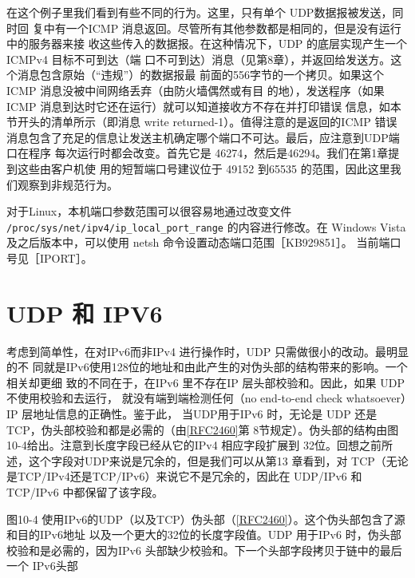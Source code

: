 在这个例子里我们看到有些不同的行为。这里，只有单个 UDP数据报被发送，同时回
复中有一个ICMP 消息返回。尽管所有其他参数都是相同的，但是没有运行中的服务器来接
收这些传入的数据报。在这种情况下，UDP 的底层实现产生一个 ICMPv4 目标不可到达（端
口不可到达）消息（见第8章），并返回给发送方。这个消息包含原始（“违规”）的数据报最
前面的556字节的一个拷贝。如果这个ICMP 消息没被中间网络丢弃（由防火墙偶然或有目
的地），发送程序（如果ICMP 消息到达时它还在运行）就可以知道接收方不存在并打印错误
信息，如本节开头的清单所示（即消息 write returned-1）。值得注意的是返回的ICMP 错误
消息包含了充足的信息让发送主机确定哪个端口不可达。最后，应注意到UDP端口在程序
每次运行时都会改变。首先它是 46274，然后是46294。我们在第1章提到这些由客户机使
用的短暂端口号建议位于 49152 到65535 的范围，因此这里我们观察到非规范行为。

\begin{tcolorbox}
    对于Linux，本机端口参数范围可以很容易地通过改变文件 \verb|/proc/sys/net/ipv4/ip_local_port_range|
    的内容进行修改。在 Windows Vista及之后版本中，可以使用 netsh 命令设置动态端口范围［KB929851］。
    当前端口号见［IPORT］。
\end{tcolorbox}

\section{UDP 和 IPV6}
考虑到简单性，在对IPv6而非IPv4 进行操作时，UDP 只需做很小的改动。最明显的不
同就是IPv6使用128位的地址和由此产生的对伪头部的结构带来的影响。一个相关却更细
致的不同在于，在IPv6 里不存在IP 层头部校验和。因此，如果 UDP 不使用校验和去运行，
就没有端到端检测任何（no end-to-end check whatsoever）IP 层地址信息的正确性。鉴于此，
当UDP用于IPv6 时，无论是 UDP 还是TCP，伪头部校验和都是必需的（由\href{https://www.rfc-editor.org/rfc/rfc2460}{[RFC2460]}第
8节规定）。伪头部的结构由图10-4给出。注意到长度字段已经从它的IPv4 相应字段扩展到
32位。回想之前所述，这个字段对UDP来说是冗余的，但是我们可以从第13 章看到，对
TCP（无论是TCP/IPv4还是TCP/IPv6）来说它不是冗余的，因此在 UDP/IPv6 和 TCP/IPv6
中都保留了该字段。

图10-4 使用IPv6的UDP（以及TCP）伪头部（\href{https://www.rfc-editor.org/rfc/rfc2460}{[RFC2460]}）。这个伪头部包含了源和目的IPv6地址
以及一个更大的32位的长度字段值。UDP 用于IPv6 时，伪头部校验和是必需的，因为IPv6
头部缺少校验和。下一个头部字段拷贝于链中的最后一个 IPv6头部

